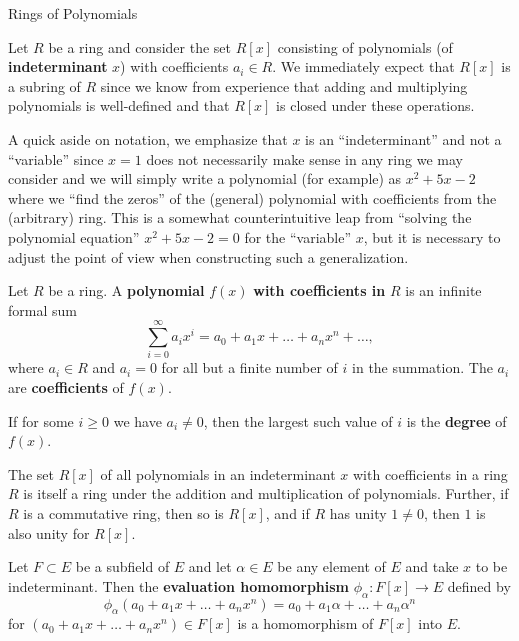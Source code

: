 
\begin{section}{Rings of Polynomials}

Let $R$ be a ring and consider the set $R[x]$ consisting of polynomials (of {\bf indeterminant} $x$) with coefficients $a_{i} \in R$. We immediately expect that $R[x]$ is a subring of $R$ since we know from experience that adding and multiplying polynomials is well-defined and that $R[x]$ is closed under these operations. 

\begin{danger}
A quick aside on notation, we emphasize that $x$ is an ``indeterminant'' and not a ``variable'' since $x = 1$ does not necessarily make sense in any ring we may consider and we will simply write a polynomial (for example) as $x^2 + 5x - 2$ where we ``find the zeros'' of the (general) polynomial with coefficients from the (arbitrary) ring. This is a somewhat counterintuitive leap from ``solving the polynomial equation'' $x^2 + 5x - 2 = 0$ for the ``variable'' $x$, but it is necessary to adjust the point of view when constructing such a generalization.
\end{danger}

\begin{defn}
Let $R$ be a ring. A {\bf polynomial} $f(x)$ {\bf with coefficients in} $R$ is an infinite formal sum
$$\sum_{i = 0}^{\infty} a_{i}x^{i} = a_{0} + a_{1}x + \dots + a_{n}x^{n} + \dots,$$ 
where $a_i \in R$ and $a_i = 0$ for all but a finite number of $i$ in the summation. The $a_{i}$ are {\bf coefficients} of $f(x)$.

If for some $i \geq 0$ we have $a_{i} \neq 0$, then the largest such value of $i$ is the {\bf degree} of $f(x)$.
\end{defn}

\begin{thm}
The set $R[x]$ of all polynomials in an indeterminant $x$ with coefficients in a ring $R$ is itself a ring under the addition and multiplication of polynomials. Further, if $R$ is a commutative ring, then so is $R[x]$, and if $R$ has unity $1 \neq 0$, then $1$ is also unity for $R[x]$.
\end{thm}

\begin{thm}
Let $F \subset E$ be a subfield of $E$ and let $\alpha \in E$ be any element of $E$ and take $x$ to be indeterminant. Then the {\bf evaluation homomorphism} $\phi_{\alpha} \colon F[x] \to E$ defined by
$$\phi_{\alpha}(a_{0} + a_{1}x + \dots + a_{n}x^{n}) = a_{0} + a_{1}\alpha + \dots + a_{n}\alpha^{n}$$ 
for $(a_{0} + a_{1}x + \dots + a_{n}x^{n}) \in F[x]$ is a homomorphism of $F[x]$ into $E$.
\end{thm}


\end{section}
